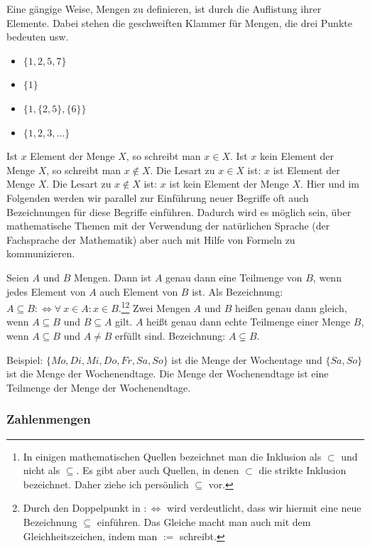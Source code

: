 Eine gängige Weise, Mengen zu definieren, ist durch die Auflistung ihrer Elemente. Dabei stehen die geschweiften Klammer für Mengen, die drei Punkte bedeuten \glqq usw\grqq.
\begin{itemize}
	\item $ \{1,2,5,7\} $
	\item $ \{1\} $
	\item $ \{1,\{2,5\},\{6\}\} $
	\item $ \{1,2,3,\ldots\} $
\end{itemize}
Ist $ x $ Element der Menge $ X $, so schreibt man $ x \in X $. Ist $ x $ kein Element der Menge $X$, so schreibt man $ x \notin X $. Die Lesart zu $x \in X$ ist: $x$ ist Element der Menge $X$. Die Lesart zu $x \not\in X$ ist: $x$ ist kein Element der Menge $X$. Hier und im Folgenden werden wir parallel zur Einführung neuer Begriffe oft auch Bezeichnungen für diese Begriffe einführen. Dadurch wird es möglich sein, über mathematische Themen mit der Verwendung der natürlichen Sprache (der Fachsprache der Mathematik) aber auch mit Hilfe von Formeln zu kommunizieren. 

Seien $ A $ und $ B $ Mengen. Dann ist $ A $ genau dann eine Teilmenge von $ B $, wenn jedes Element von $ A $ auch Element von $ B $ ist. Als Bezeichnung:  $ A \subseteq B :\Leftrightarrow \forall\: x \in A : x \in B $.\footnote{In einigen mathematischen Quellen bezeichnet man die Inklusion als $ \subset $ und nicht als $ \subseteq $. Es gibt aber auch Quellen, in denen $ \subset $ die strikte Inklusion bezeichnet. Daher ziehe ich persönlich $ \subseteq $ vor.}\footnote{Durch den Doppelpunkt in $:\Leftrightarrow$ wird verdeutlicht, dass wir hiermit eine neue Bezeichnung $\subseteq$ einführen. Das Gleiche macht man auch mit dem Gleichheitszeichen, indem man $:=$ schreibt.}  Zwei Mengen $ A $ und $ B $ heißen genau dann gleich, wenn $ A \subseteq B $ und $ B \subseteq A $ gilt. $ A $ heißt genau dann echte Teilmenge einer Menge $ B $, wenn $ A \subseteq B $ und $ A \neq B $ erfüllt sind. Bezeichnung: $ A \varsubsetneq B $.


Beispiel: $\{Mo, Di, Mi, Do, Fr, Sa, So \} $  ist die Menge der Wochentage und $\{Sa,So\}$ ist die Menge der Wochenendtage. Die Menge der Wochenendtage ist eine Teilmenge der Menge der Wochenendtage. 

\subsubsection{Zahlenmengen}

